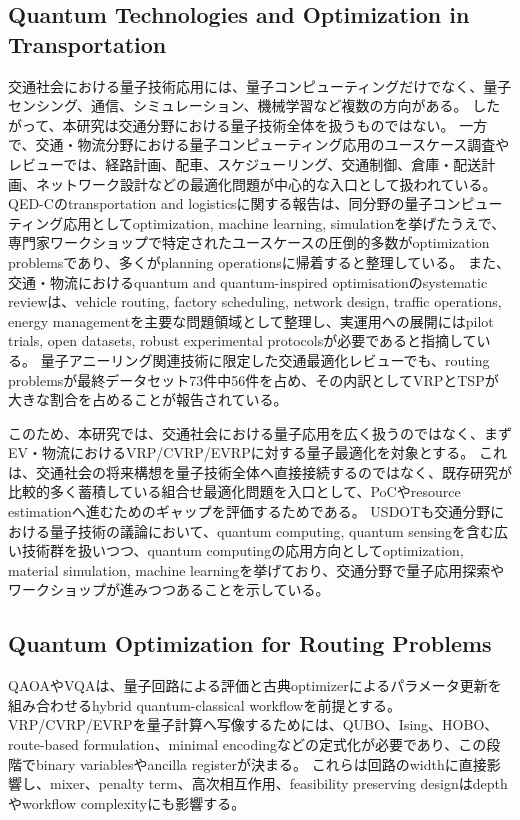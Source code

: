 \subsection{Quantum Technologies and Optimization in Transportation}

交通社会における量子技術応用には、量子コンピューティングだけでなく、量子センシング、通信、シミュレーション、機械学習など複数の方向がある。
したがって、本研究は交通分野における量子技術全体を扱うものではない。
一方で、交通・物流分野における量子コンピューティング応用のユースケース調査やレビューでは、経路計画、配車、スケジューリング、交通制御、倉庫・配送計画、ネットワーク設計などの最適化問題が中心的な入口として扱われている。
QED-Cのtransportation and logisticsに関する報告は、同分野の量子コンピューティング応用としてoptimization, machine learning, simulationを挙げたうえで、専門家ワークショップで特定されたユースケースの圧倒的多数がoptimization problemsであり、多くがplanning operationsに帰着すると整理している\cite{qedc2024transportlogistics}。
また、交通・物流におけるquantum and quantum-inspired optimisationのsystematic reviewは、vehicle routing, factory scheduling, network design, traffic operations, energy managementを主要な問題領域として整理し、実運用への展開にはpilot trials, open datasets, robust experimental protocolsが必要であると指摘している\cite{liu2025quantumtransportreview}。
量子アニーリング関連技術に限定した交通最適化レビューでも、routing problemsが最終データセット73件中56件を占め、その内訳としてVRPとTSPが大きな割合を占めることが報告されている\cite{mohammed2025qatransportreview}。

このため、本研究では、交通社会における量子応用を広く扱うのではなく、まずEV・物流におけるVRP/CVRP/EVRPに対する量子最適化を対象とする。
これは、交通社会の将来構想を量子技術全体へ直接接続するのではなく、既存研究が比較的多く蓄積している組合せ最適化問題を入口として、PoCやresource estimationへ進むためのギャップを評価するためである。
USDOTも交通分野における量子技術の議論において、quantum computing, quantum sensingを含む広い技術群を扱いつつ、quantum computingの応用方向としてoptimization, material simulation, machine learningを挙げており、交通分野で量子応用探索やワークショップが進みつつあることを示している\cite{usdot2026quantumtransport}。

\subsection{Quantum Optimization for Routing Problems}

QAOAやVQAは、量子回路による評価と古典optimizerによるパラメータ更新を組み合わせるhybrid quantum-classical workflowを前提とする。
VRP/CVRP/EVRPを量子計算へ写像するためには、QUBO、Ising、HOBO、route-based formulation、minimal encodingなどの定式化が必要であり、この段階でbinary variablesやancilla registerが決まる。
これらは回路のwidthに直接影響し、mixer、penalty term、高次相互作用、feasibility preserving designはdepthやworkflow complexityにも影響する。

